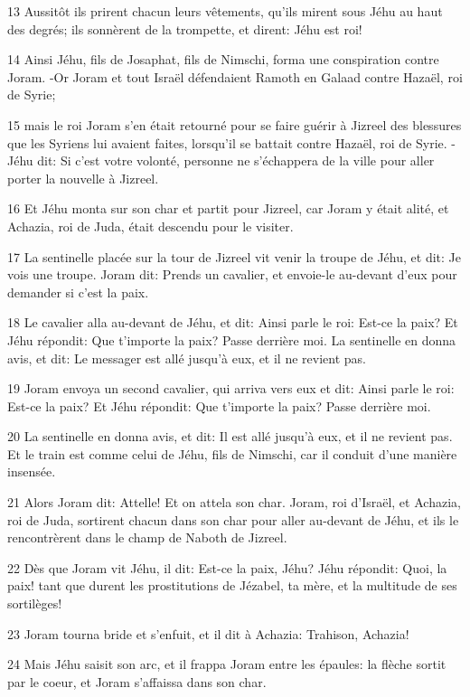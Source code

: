 \par 13 Aussitôt ils prirent chacun leurs vêtements, qu'ils mirent sous Jéhu au haut des degrés; ils sonnèrent de la trompette, et dirent: Jéhu est roi!
\par 14 Ainsi Jéhu, fils de Josaphat, fils de Nimschi, forma une conspiration contre Joram. -Or Joram et tout Israël défendaient Ramoth en Galaad contre Hazaël, roi de Syrie;
\par 15 mais le roi Joram s'en était retourné pour se faire guérir à Jizreel des blessures que les Syriens lui avaient faites, lorsqu'il se battait contre Hazaël, roi de Syrie. -Jéhu dit: Si c'est votre volonté, personne ne s'échappera de la ville pour aller porter la nouvelle à Jizreel.
\par 16 Et Jéhu monta sur son char et partit pour Jizreel, car Joram y était alité, et Achazia, roi de Juda, était descendu pour le visiter.
\par 17 La sentinelle placée sur la tour de Jizreel vit venir la troupe de Jéhu, et dit: Je vois une troupe. Joram dit: Prends un cavalier, et envoie-le au-devant d'eux pour demander si c'est la paix.
\par 18 Le cavalier alla au-devant de Jéhu, et dit: Ainsi parle le roi: Est-ce la paix? Et Jéhu répondit: Que t'importe la paix? Passe derrière moi. La sentinelle en donna avis, et dit: Le messager est allé jusqu'à eux, et il ne revient pas.
\par 19 Joram envoya un second cavalier, qui arriva vers eux et dit: Ainsi parle le roi: Est-ce la paix? Et Jéhu répondit: Que t'importe la paix? Passe derrière moi.
\par 20 La sentinelle en donna avis, et dit: Il est allé jusqu'à eux, et il ne revient pas. Et le train est comme celui de Jéhu, fils de Nimschi, car il conduit d'une manière insensée.
\par 21 Alors Joram dit: Attelle! Et on attela son char. Joram, roi d'Israël, et Achazia, roi de Juda, sortirent chacun dans son char pour aller au-devant de Jéhu, et ils le rencontrèrent dans le champ de Naboth de Jizreel.
\par 22 Dès que Joram vit Jéhu, il dit: Est-ce la paix, Jéhu? Jéhu répondit: Quoi, la paix! tant que durent les prostitutions de Jézabel, ta mère, et la multitude de ses sortilèges!
\par 23 Joram tourna bride et s'enfuit, et il dit à Achazia: Trahison, Achazia!
\par 24 Mais Jéhu saisit son arc, et il frappa Joram entre les épaules: la flèche sortit par le coeur, et Joram s'affaissa dans son char.
